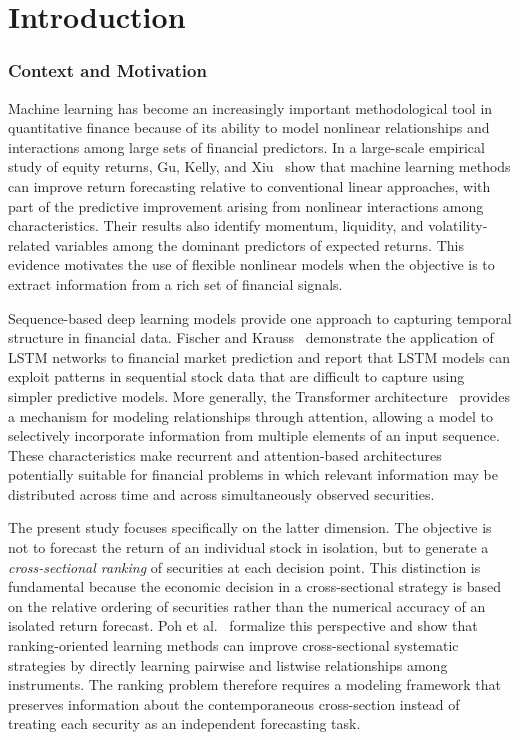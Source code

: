 \setcounter{page}{1}

\part{Introduction}

\section{Context and Motivation}
Machine learning has become an increasingly important methodological tool in quantitative finance because of its ability to model nonlinear relationships and interactions among large sets of financial predictors. In a large-scale empirical study of equity returns, Gu, Kelly, and Xiu~\cite{Gu2020} show that machine learning methods can improve return forecasting relative to conventional linear approaches, with part of the predictive improvement arising from nonlinear interactions among characteristics. Their results also identify momentum, liquidity, and volatility-related variables among the dominant predictors of expected returns. This evidence motivates the use of flexible nonlinear models when the objective is to extract information from a rich set of financial signals.

\medskip

Sequence-based deep learning models provide one approach to capturing temporal structure in financial data. Fischer and Krauss~\cite{FischerKrauss2018} demonstrate the application of \acf{LSTM} networks to financial market prediction and report that \acs{LSTM} models can exploit patterns in sequential stock data that are difficult to capture using simpler predictive models. More generally, the Transformer architecture~\cite{Vaswani2017} provides a mechanism for modeling relationships through attention, allowing a model to selectively incorporate information from multiple elements of an input sequence. These characteristics make recurrent and attention-based architectures potentially suitable for financial problems in which relevant information may be distributed across time and across simultaneously observed securities.

\medskip

The present study focuses specifically on the latter dimension. The objective is not to forecast the return of an individual stock in isolation, but to generate a \emph{cross-sectional ranking} of securities at each decision point. This distinction is fundamental because the economic decision in a cross-sectional strategy is based on the relative ordering of securities rather than the numerical accuracy of an isolated return forecast. Poh et al.~\cite{Poh2021} formalize this perspective and show that ranking-oriented learning methods can improve cross-sectional systematic strategies by directly learning pairwise and listwise relationships among instruments. The ranking problem therefore requires a modeling framework that preserves information about the contemporaneous cross-section instead of treating each security as an independent forecasting task.

